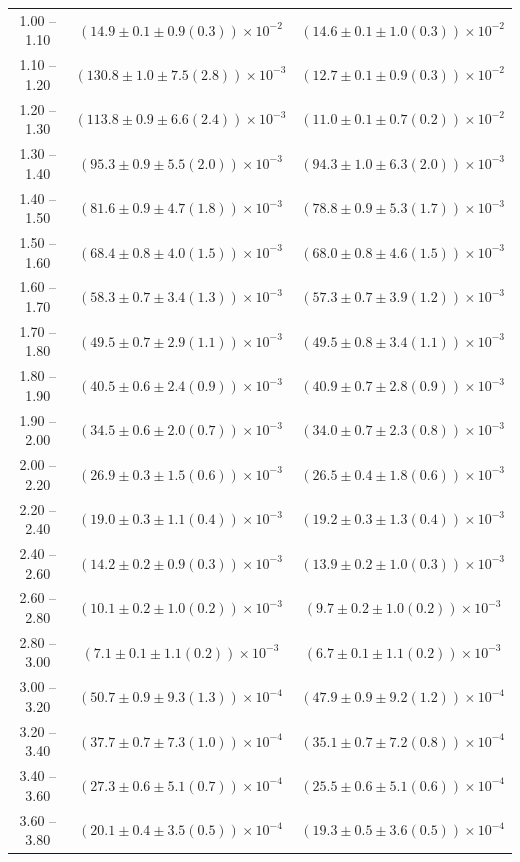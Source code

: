 \begin{table}
\begin{center}
\begin{tabular}{ c | c c }
1.00 -- 1.10 & $(14.9\pm0.1\pm0.9(0.3))\times10^{-2}$ & $(14.6\pm0.1\pm1.0(0.3))\times10^{-2}$ \\ 
1.10 -- 1.20 & $(130.8\pm1.0\pm7.5(2.8))\times10^{-3}$ & $(12.7\pm0.1\pm0.9(0.3))\times10^{-2}$ \\ 
1.20 -- 1.30 & $(113.8\pm0.9\pm6.6(2.4))\times10^{-3}$ & $(11.0\pm0.1\pm0.7(0.2))\times10^{-2}$ \\ 
1.30 -- 1.40 & $(95.3\pm0.9\pm5.5(2.0))\times10^{-3}$ & $(94.3\pm1.0\pm6.3(2.0))\times10^{-3}$ \\ 
1.40 -- 1.50 & $(81.6\pm0.9\pm4.7(1.8))\times10^{-3}$ & $(78.8\pm0.9\pm5.3(1.7))\times10^{-3}$ \\ 
1.50 -- 1.60 & $(68.4\pm0.8\pm4.0(1.5))\times10^{-3}$ & $(68.0\pm0.8\pm4.6(1.5))\times10^{-3}$ \\ 
1.60 -- 1.70 & $(58.3\pm0.7\pm3.4(1.3))\times10^{-3}$ & $(57.3\pm0.7\pm3.9(1.2))\times10^{-3}$ \\ 
1.70 -- 1.80 & $(49.5\pm0.7\pm2.9(1.1))\times10^{-3}$ & $(49.5\pm0.8\pm3.4(1.1))\times10^{-3}$ \\ 
1.80 -- 1.90 & $(40.5\pm0.6\pm2.4(0.9))\times10^{-3}$ & $(40.9\pm0.7\pm2.8(0.9))\times10^{-3}$ \\ 
1.90 -- 2.00 & $(34.5\pm0.6\pm2.0(0.7))\times10^{-3}$ & $(34.0\pm0.7\pm2.3(0.8))\times10^{-3}$ \\ 
2.00 -- 2.20 & $(26.9\pm0.3\pm1.5(0.6))\times10^{-3}$ & $(26.5\pm0.4\pm1.8(0.6))\times10^{-3}$ \\ 
2.20 -- 2.40 & $(19.0\pm0.3\pm1.1(0.4))\times10^{-3}$ & $(19.2\pm0.3\pm1.3(0.4))\times10^{-3}$ \\ 
2.40 -- 2.60 & $(14.2\pm0.2\pm0.9(0.3))\times10^{-3}$ & $(13.9\pm0.2\pm1.0(0.3))\times10^{-3}$ \\ 
2.60 -- 2.80 & $(10.1\pm0.2\pm1.0(0.2))\times10^{-3}$ & $(9.7\pm0.2\pm1.0(0.2))\times10^{-3}$ \\ 
2.80 -- 3.00 & $(7.1\pm0.1\pm1.1(0.2))\times10^{-3}$ & $(6.7\pm0.1\pm1.1(0.2))\times10^{-3}$ \\ 
3.00 -- 3.20 & $(50.7\pm0.9\pm9.3(1.3))\times10^{-4}$ & $(47.9\pm0.9\pm9.2(1.2))\times10^{-4}$ \\ 
3.20 -- 3.40 & $(37.7\pm0.7\pm7.3(1.0))\times10^{-4}$ & $(35.1\pm0.7\pm7.2(0.8))\times10^{-4}$ \\ 
3.40 -- 3.60 & $(27.3\pm0.6\pm5.1(0.7))\times10^{-4}$ & $(25.5\pm0.6\pm5.1(0.6))\times10^{-4}$ \\ 
3.60 -- 3.80 & $(20.1\pm0.4\pm3.5(0.5))\times10^{-4}$ & $(19.3\pm0.5\pm3.6(0.5))\times10^{-4}$ \\ 

\end{tabular}
\end{center}
\end{table}
